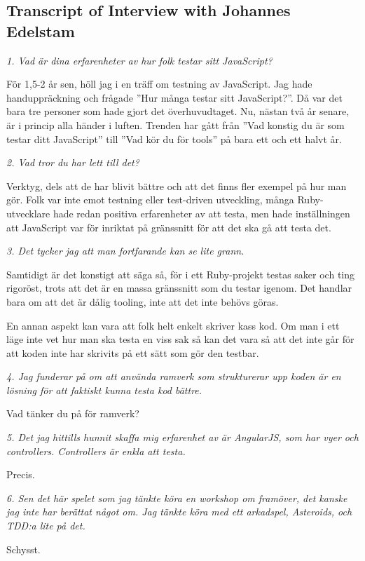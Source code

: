 \documentclass[11pt]{article}
\begin{document}
\subsection{Transcript of Interview with Johannes Edelstam}

\emph{1. Vad är dina erfarenheter av hur folk testar sitt JavaScript?}

För 1,5-2 år sen, höll jag i en träff om testning av JavaScript. Jag hade handuppräckning och frågade ”Hur många testar sitt JavaScript?”. Då var det bara tre personer som hade gjort det överhuvudtaget. Nu, nästan två år senare, är i princip alla händer i luften. Trenden har gått från ”Vad konstig du är som testar ditt JavaScript” till ”Vad kör du för tools” på bara ett och ett halvt år.

\emph{2. Vad tror du har lett till det?}

Verktyg, dels att de har blivit bättre och att det finns fler exempel på hur man gör. Folk var inte emot testning eller test-driven utveckling, många Ruby-utvecklare hade redan positiva erfarenheter av att testa, men hade inställningen att JavaScript var för inriktat på gränssnitt för att det ska gå att testa det.

\emph{3. Det tycker jag att man fortfarande kan se lite grann.}

Samtidigt är det konstigt att säga så, för i ett Ruby-projekt testas saker och ting rigoröst, trots att det är en massa gränssnitt som du testar igenom. Det handlar bara om att det är dålig tooling, inte att det inte behövs göras.

En annan aspekt kan vara att folk helt enkelt skriver kass kod. Om man i ett läge inte vet hur man ska testa en viss sak så kan det vara så att det inte går för att koden inte har skrivits på ett sätt som gör den testbar.

\emph{4. Jag funderar på om att använda ramverk som strukturerar upp koden är en lösning för att faktiskt kunna testa kod bättre.}

Vad tänker du på för ramverk?

\emph{5. Det jag hittills hunnit skaffa mig erfarenhet av är AngularJS, som har vyer och controllers. Controllers är enkla att testa.}

Precis.

\emph{6. Sen det här spelet som jag tänkte köra en workshop om framöver, det kanske jag inte har berättat något om. Jag tänkte köra med ett arkadspel, Asteroids, och TDD:a lite på det.}

Schysst.
\end{document}
